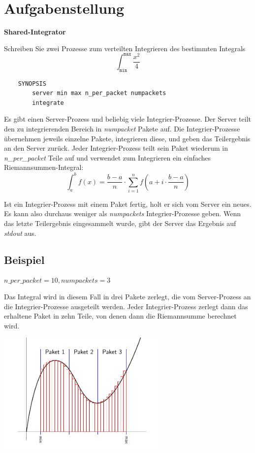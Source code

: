 

\usepackage{graphicx}




\section*{Aufgabenstellung}

\textbf{Shared-Integrator}

Schreiben Sie zwei Prozesse zum verteilten Integrieren des bestimmten Integrals
$$\int^{\mathtt{max}}_{\mathtt{min}} \frac{x^2}{4}$$

\begin{verbatim}
    SYNOPSIS
        server min max n_per_packet numpackets
        integrate
\end{verbatim}

Es gibt einen Server-Prozess und beliebig viele Integrier-Prozesse. Der Server
teilt den zu integrierenden Bereich in \emph{numpacket} Pakete auf. Die
Integrier-Prozesse übernehmen jeweils einzelne Pakete, integrieren diese, und
geben das Teilergebnis an den Server zurück. Jeder Integrier-Prozess teilt sein
Paket wiederum in \emph{n\_per\_packet} Teile auf und verwendet zum Integrieren
ein einfaches Riemannsummen-Integral:
$$\int^b_a f(x) = \frac{b-a}n \cdot \sum_{i=1}^{n} f\left(a + i\cdot \frac{b-a}{n}\right)$$

Ist ein Integrier-Prozess mit einem Paket fertig, holt er sich vom Server ein
neues. Es kann also durchaus weniger als \emph{numpackets} Integrier-Prozesse
geben. Wenn das letzte Teilergebnis eingesammelt wurde, gibt der Server das
Ergebnis auf \emph{stdout} aus.

\subsection*{Beispiel}

$n\_per\_packet = 10, numpackets = 3$

Das Integral wird in diesem Fall in drei Pakete zerlegt, die vom Server-Prozess
an die Integrier-Prozesse ausgeteilt werden. Jeder Integrier-Prozess zerlegt
dann das erhaltene Paket in zehn Teile, von denen dann die Riemannsumme
berechnet wird.

\begin{center}
\includegraphics[height=6cm]{integfigure.pdf}
\end{center}

